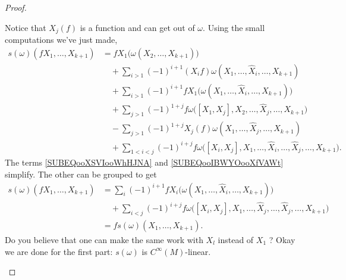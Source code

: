 \begin{proof}
\begin{subproof}
		Notice that \(  X_j(f)\) is a function and can get out of \( \omega\).
		Using the small computations we've just made,
		\begin{subequations}
			\begin{align}
				s(\omega)(fX_1,\ldots,X_{k+1}) & =fX_1\big( \omega(X_2,\ldots,X_{k+1}) \big)                                                                                                                             \\
				                               & \quad + \sum_{i>1}(-1)^{i+1}(X_if)\omega(X_1,\ldots,\hat X_i,\ldots,X_{k+1})                                                                                            \\
				                               & \quad + \sum_{i>1}(-1)^{i+1}fX_1\big( \omega(X_1,\ldots,\hat X_i,\ldots,X_{k+1}) \big)                           \label{SUBEQooXSVIooWhHJNA}                            \\
				                               & \quad +\sum_{j>1}(-1)^{1+j}f\omega\big( [X_1,X_j], X_2,\ldots, \hat X_j,\ldots,X_{k+1} \big)                                                                            \\
				                               & \quad - \sum_{j>1}(-1)^{1+j}X_j(f)\omega(X_1,\ldots,\hat X_j,\ldots,X_{k+1})                                                               \label{SUBEQooIBWYOooXfVAWt} \\
				                               & \quad + \sum_{1<i<j}(-1)^{i+j}f\omega\big( [X_i,X_j],X_1,\ldots,\hat X_i,\ldots,\hat X_j,\ldots,X_{k+1} \big).
			\end{align}
		\end{subequations}
		The terms \eqref{SUBEQooXSVIooWhHJNA} and \eqref{SUBEQooIBWYOooXfVAWt} simplify. The other can be grouped to get
		\begin{subequations}
			\begin{align}
				s(\omega)(fX_1,\ldots,X_{k+1}) & = \sum_i(-1)^{i+1}fX_i\big( \omega(X_1,\ldots,\hat X_i,\ldots,X_{k+1}) \big)                                       \\
				                               & \quad\nonumber+\sum_{i<j}(-1)^{i+j}f\omega\big( [X_i,X_j],X_1,\ldots,\hat X_j,\ldots,\hat X_j,\ldots,X_{k+1} \big) \\
				                               & =fs(\omega)(X_1,\ldots,X_{k+1}).
			\end{align}
		\end{subequations}
		Do you believe that one can make the same work with \( X_l\) instead of \( X_1\) ? Okay we are done for the first part: \( s(\omega)\) is \( C^{\infty}(M)\)-linear.
	\end{subproof}


\end{proof}
